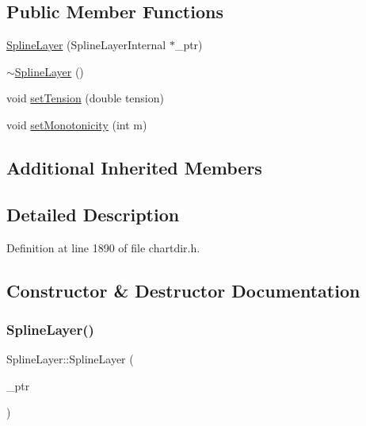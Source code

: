 \subsection*{Public Member Functions}
\begin{DoxyCompactItemize}
\item 
\hyperlink{class_spline_layer_a0785ad3b716584e22d07ac305c217a5b}{Spline\+Layer} (Spline\+Layer\+Internal $\ast$\+\_\+ptr)
\item 
\hyperlink{class_spline_layer_a3c0b391ce5957b83b00538c079e39c83}{$\sim$\+Spline\+Layer} ()
\item 
void \hyperlink{class_spline_layer_a1bea981af7bfba2930af1a0ee543b348}{set\+Tension} (double tension)
\item 
void \hyperlink{class_spline_layer_aa829ae59416c115940c509ab42de74d2}{set\+Monotonicity} (int m)
\end{DoxyCompactItemize}
\subsection*{Additional Inherited Members}


\subsection{Detailed Description}


Definition at line 1890 of file chartdir.\+h.



\subsection{Constructor \& Destructor Documentation}
\mbox{\label{class_spline_layer_a0785ad3b716584e22d07ac305c217a5b}} 
\subsubsection{\texorpdfstring{Spline\+Layer()}{SplineLayer()}}
{\footnotesize\ttfamily Spline\+Layer\+::\+Spline\+Layer (\begin{DoxyParamCaption}\item[{Spline\+Layer\+Internal $\ast$}]{\+\_\+ptr }\end{DoxyParamCaption})\hspace{0.3cm}{\ttfamily [inline]}}



